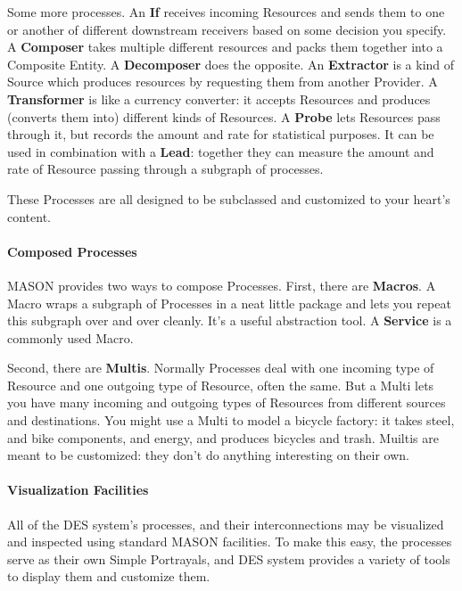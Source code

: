 \documentclass[twoside,10pt]{article}
\begin{document}
Some more processes.  An {\bf If} receives incoming Resources and sends them to one or another of different downstream receivers based on some decision you specify.  A {\bf Composer} takes multiple different resources and packs them together into a Composite Entity.  A {\bf Decomposer} does the opposite.  An {\bf Extractor} is a kind of Source which produces resources by requesting them from another Provider.  A {\bf Transformer} is like a currency converter: it accepts Resources and produces (converts them into) different kinds of Resources.  A {\bf Probe} lets Resources pass through it, but records the amount and rate for statistical purposes.  It can be used in combination with a {\bf Lead}: together they can measure the amount and rate of Resource passing through a subgraph of processes.

These Processes are all designed to be subclassed and customized to your heart's content.

\paragraph{Composed Processes}

MASON provides two ways to compose Processes.  First, there are {\bf Macros}.  A Macro wraps a subgraph of Processes in a neat little package and lets you repeat this subgraph over and over cleanly.  It's a useful abstraction tool.  A {\bf Service} is a commonly used Macro.  

Second, there are {\bf Multis}.  Normally Processes deal with one incoming type of Resource and one outgoing type of Resource, often the same.  But a Multi lets you have many incoming and outgoing types of Resources from different sources and destinations. You might use a Multi to model a bicycle factory: it takes steel, and bike components, and energy, and produces bicycles and trash.  Muiltis are meant to be customized: they don't do anything interesting on their own.

\paragraph{Visualization Facilities}

All of the DES system's processes, and their interconnections may be visualized and inspected using standard MASON facilities.  To make this easy, the processes serve as their own Simple Portrayals, and DES system provides a variety of tools to display them and customize them.
  
\end{document}
